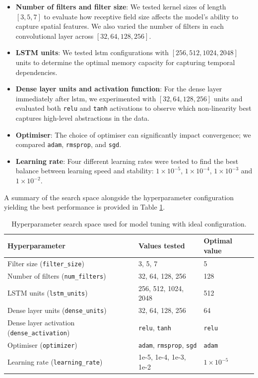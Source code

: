 \begin{itemize} 
\item \textbf{Number of filters and filter size}: We tested kernel sizes of length $[3, 5, 7]$ to evaluate how receptive field size affects the model's ability to capture spatial features. We also varied the number of filters in each convolutional layer across $[32, 64, 128, 256]$.
\item \textbf{LSTM units}: We tested \acrshort{lstm} configurations with 
$[256, 512, 1024, 2048]$ units to determine the optimal memory capacity for capturing temporal dependencies. 
\item \textbf{Dense layer units and activation function}: For the dense layer immediately after \acrshort{lstm}, we experimented with $[32, 64, 128, 256]$ units and evaluated both \texttt{relu} and \texttt{tanh} activations to observe which non-linearity best captures high-level abstractions in the data. 
\item \textbf{Optimiser}: The choice of optimiser can significantly impact convergence; we compared \texttt{adam}, \texttt{rmsprop}, and \texttt{sgd}. 
\item \textbf{Learning rate}: Four different learning rates were tested to find the best balance between learning speed and stability: $1 \times 10^{-5}$, $1 \times 10^{-4}$, $1 \times 10^{-3}$ and $1 \times 10^{-2}$.
\end{itemize}

A summary of the search space alongside the hyperparameter configuration yielding the best performance is provided in Table \ref{tab:hyperparameter-search-space}.

\begin{table}[htbp] 
\centering 
    \begin{tabular}{lll} 
    \toprule 
    \textbf{Hyperparameter} & \textbf{Values tested} & \textbf{Optimal value} \\ 
    \midrule 
    Filter size (\texttt{filter\_size}) & 3, 5, 7 & 5 \\ 
    Number of filters (\texttt{num\_filters}) & 32, 64, 128, 256 & 128 \\ 
    LSTM units (\texttt{lstm\_units}) & 256, 512, 1024, 2048 & 512 \\ 
    Dense layer units (\texttt{dense\_units}) & 32, 64, 128, 256 & 64 \\ 
    Dense layer activation (\texttt{dense\_activation}) & \texttt{relu}, \texttt{tanh} & \texttt{relu} \\ 
    Optimiser (\texttt{optimizer}) & \texttt{adam}, \texttt{rmsprop}, \texttt{sgd} & \texttt{adam} \\ 
    Learning rate (\texttt{learning\_rate}) & 1e-5, 1e-4, 1e-3, 1e-2 & $1 \times 10^{-5}$ \\ 
    \bottomrule 
    \end{tabular} 
\caption{Hyperparameter search space used for model tuning with ideal configuration.} 
\label{tab:hyperparameter-search-space} 
\end{table}

